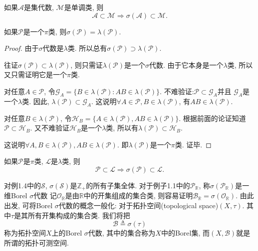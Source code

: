 \begin{corollary}
	如果$\mathscr{A}$是集代数, $\mathscr{M}$是单调类, 则\begin{equation}
	\mathscr{A}\subset \mathscr{M}\Rightarrow \sigma(\mathscr{A})\subset\mathscr{M}.
	\end{equation}
\end{corollary}

\begin{theorem}
	如果$\mathscr{P}$是一个$\pi$类, 则$\sigma(\mathscr{P}) = \lambda(\mathscr{P})$.
\end{theorem}
\begin{proof}
	由于$\sigma$代数是$\lambda$类. 所以总有$\sigma(\mathscr{P})\supset\lambda(\mathscr{P})$.
	
	往证$\sigma(\mathscr{P})\subset\lambda(\mathscr{P})$, 则只需证$\lambda(\mathscr{P})$是一个$\sigma$代数. 由于它本身是一个$\lambda$类, 所以又只需证明它是一个$\pi$类.
	
	对任意$A\in\mathscr{P}$, 令$\mathscr{G}_A = \{B\in\lambda(\mathscr{P}):AB\in\lambda(\mathscr{P})\}$. 不难验证:$\mathscr{P}\subset\mathscr{G}_A $并且 $\mathscr{G}_A$是一个$\lambda$类.
	因此, $\lambda(\mathscr{P})\subset \mathscr{G}_A$. 这说明$\forall A\in\mathscr{P},B\in\lambda(\mathscr{P})$, 有$AB\in\lambda(\mathscr{P})$.
	
	对任意$B\in\lambda(\mathscr{P})$, 令$\mathscr{H}_B = \{A\in\lambda(\mathscr{P}), AB\in\lambda(\mathscr{P})\}$. 根据前面的论证知道$\mathscr{P}\subset \mathscr{H}_B$. 又不难验证$\mathscr{H}_B$是一个$\lambda$类, 所以有$\lambda(\mathscr{P})\subset\mathscr{H}_B$.
	
	这说明$\forall A,B\in\lambda(\mathscr{P}), AB\in\lambda(\mathscr{P})$. 即$\lambda(\mathscr{P})$是一个$\pi$类. 证毕.
\end{proof}

\begin{corollary}
	如果$\mathscr{P}$是$\pi$类, $\mathscr{L}$是$\lambda$类, 则\begin{equation}
	\mathscr{P}\subset \mathscr{L}\Rightarrow \sigma(\mathscr{P})\subset\mathscr{L}.
	\end{equation}
\end{corollary}

\begin{example}
	对例1.4中的$\mathscr{S}$, $\sigma(\mathscr{S})$是$\mathbb{Z}_{+}$的所有子集全体. 对于例子1.1中的$\mathscr{P}_{\mathbb{R}}$, 称$\sigma(\mathscr{P}_{\mathbb{R}})$是一维Borel $\sigma$代数 记$\mathscr{O}_{\mathbb{R}}$是由$\mathbb{R}$中的开集组成的集合类, 则容易证明$\mathscr{B}_{\mathbb{R}} = \sigma(\mathscr{O}_\mathbb{R})$. 由此出发, 可将Borel $\sigma$代数的概念一般化: 对于拓扑空间(topological space)$(X,\tau)$. 其中$\tau$是其所有开集构成的集合类. 我们将把\begin{equation}
	\mathscr{B} \triangleq \sigma(\tau)
	\end{equation}
	称为拓扑空间$X$上的Borel $\sigma$代数, 其中的集合称为$X$中的Borel集, 而$(X,\mathscr{B})$就是所谓的拓扑可测空间.
\end{example}

